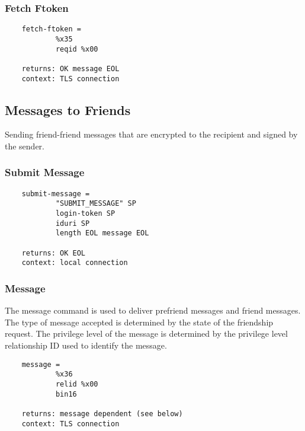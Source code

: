 \documentclass[letterpaper,11pt,oneside]{article}
\begin{document}
\subsubsection{Fetch Ftoken}

\vspace{10pt}
\begin{verbatim}
    fetch-ftoken = 
            %x35
            reqid %x00

    returns: OK message EOL
    context: TLS connection
\end{verbatim}
    
\subsection{Messages to Friends}

Sending friend-friend messages that are encrypted to the recipient and signed
by the sender. 

\subsubsection{Submit Message}

\vspace{10pt}
\begin{verbatim}
    submit-message = 
            "SUBMIT_MESSAGE" SP 
            login-token SP
            iduri SP 
            length EOL message EOL

    returns: OK EOL
    context: local connection
\end{verbatim}
\vspace{10pt}


\subsubsection{Message}

The message command is used to deliver prefriend messages and friend messages.
The type of message accepted is determined by the state of the friendship
request. The privilege level of the message is determined by the privilege
level relationship ID used to identify the message.

\vspace{10pt}
\begin{verbatim}
    message =
            %x36 
            relid %x00
            bin16 

    returns: message dependent (see below)
    context: TLS connection
\end{verbatim}
\end{document}
